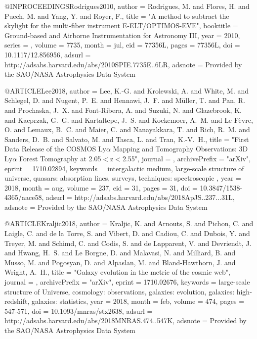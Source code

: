 \documentclass{aa}
\begin{document}
{{{{{{{{@INPROCEEDINGS{Rodrigues2010,
   author = {{Rodrigues}, M. and {Flores}, H. and {Puech}, M. and {Yang}, Y. and 
	{Royer}, F.},
    title = "{A method to subtract the skylight for the multi-fiber instrument E-ELT/OPTIMOS-EVE}",
booktitle = {Ground-based and Airborne Instrumentation for Astronomy III},
     year = 2010,
   series = {\procspie},
   volume = 7735,
    month = jul,
      eid = {77356L},
    pages = {77356L},
      doi = {10.1117/12.856956},
   adsurl = {http://adsabs.harvard.edu/abs/2010SPIE.7735E..6LR},
  adsnote = {Provided by the SAO/NASA Astrophysics Data System}
}

@ARTICLE{Lee2018,
   author = {{Lee}, K.-G. and {Krolewski}, A. and {White}, M. and {Schlegel}, D. and 
	{Nugent}, P.~E. and {Hennawi}, J.~F. and {M{\"u}ller}, T. and 
	{Pan}, R. and {Prochaska}, J.~X. and {Font-Ribera}, A. and {Suzuki}, N. and 
	{Glazebrook}, K. and {Kacprzak}, G.~G. and {Kartaltepe}, J.~S. and 
	{Koekemoer}, A.~M. and {Le F{\`e}vre}, O. and {Lemaux}, B.~C. and 
	{Maier}, C. and {Nanayakkara}, T. and {Rich}, R.~M. and {Sanders}, D.~B. and 
	{Salvato}, M. and {Tasca}, L. and {Tran}, K.-V.~H.},
    title = "{First Data Release of the COSMOS Ly{$\alpha$} Mapping and Tomography Observations: 3D Ly{$\alpha$} Forest Tomography at 2.05{\nbsp}$\lt${\nbsp}z{\nbsp}$\lt${\nbsp}2.55}",
  journal = {\apjs},
archivePrefix = "arXiv",
   eprint = {1710.02894},
 keywords = {intergalactic medium, large-scale structure of universe, quasars: absorption lines, surveys, techniques: spectroscopic },
     year = 2018,
    month = aug,
   volume = 237,
      eid = {31},
    pages = {31},
      doi = {10.3847/1538-4365/aace58},
   adsurl = {http://adsabs.harvard.edu/abs/2018ApJS..237...31L},
  adsnote = {Provided by the SAO/NASA Astrophysics Data System}
}

@ARTICLE{Kraljic2018,
   author = {{Kraljic}, K. and {Arnouts}, S. and {Pichon}, C. and {Laigle}, C. and 
	{de la Torre}, S. and {Vibert}, D. and {Cadiou}, C. and {Dubois}, Y. and 
	{Treyer}, M. and {Schimd}, C. and {Codis}, S. and {de Lapparent}, V. and 
	{Devriendt}, J. and {Hwang}, H.~S. and {Le Borgne}, D. and {Malavasi}, N. and 
	{Milliard}, B. and {Musso}, M. and {Pogosyan}, D. and {Alpaslan}, M. and 
	{Bland-Hawthorn}, J. and {Wright}, A.~H.},
    title = "{Galaxy evolution in the metric of the cosmic web}",
  journal = {\mnras},
archivePrefix = "arXiv",
   eprint = {1710.02676},
 keywords = {large-scale structure of Universe, cosmology: observations, galaxies: evolution, galaxies: high-redshift, galaxies: statistics},
     year = 2018,
    month = feb,
   volume = 474,
    pages = {547-571},
      doi = {10.1093/mnras/stx2638},
   adsurl = {http://adsabs.harvard.edu/abs/2018MNRAS.474..547K},
  adsnote = {Provided by the SAO/NASA Astrophysics Data System}
}


}}}}}}}}
\end{document}

